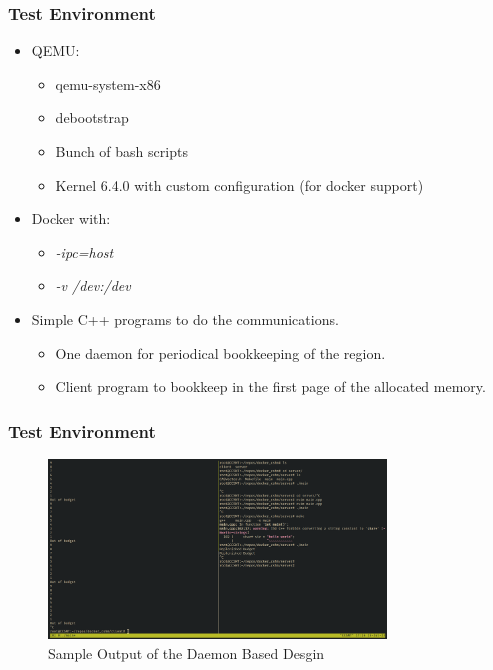 \documentclass{beamer}
\begin{document}
\begin{frame}
    \frametitle{Test Environment}
    \begin{itemize}
        \item QEMU:
            \begin{itemize}
                \item qemu-system-x86
                \item debootstrap
                \item Bunch of bash scripts
                \item Kernel 6.4.0 with custom configuration (for docker support)
            \end{itemize}
        \item Docker with:
            \begin{itemize}
                \item \textit{-ipc=host}
                \item \textit{-v /dev:/dev}
            \end{itemize}
        \item Simple C++ programs to do the communications.
            \begin{itemize}
                \item One daemon for periodical bookkeeping of the region.
                \item Client program to bookkeep in the first page of the
                    allocated memory.
            \end{itemize}
    \end{itemize}
\end{frame}

\begin{frame}
    \frametitle{Test Environment}
    \begin{figure}
        \centering
        \includegraphics[width=0.8\textwidth]{res2.png}
        \caption{Sample Output of the Daemon Based Desgin}
        \label{fig:res2}
    \end{figure}
\end{frame}
\end{document}

